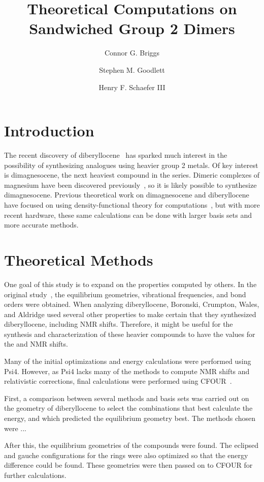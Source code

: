 \documentclass[journal=jpcafh, manuscript=article]{achemso}
\author{Connor G. Briggs}
\author{Stephen M. Goodlett}
\author{Henry F. Schaefer III}
\affiliation{Department of Chemistry and Center for Computational Quantum Chemistry, University of Georgia, Athens, GA, USA}
\title{Theoretical Computations on Sandwiched Group 2 Dimers}
\begin{document}
\begin{abstract}

\end{abstract}

\section{Introduction}

The recent discovery of diberyllocene~\cite{boronski_diberyllocene_2023} has sparked much interest in the possibility of synthesizing analogues using heavier group 2 metals. Of key interest is dimagnesocene, the next heaviest compound in the series. Dimeric complexes of magnesium have been discovered previously~\cite{stasch_stable_2011,green_stable_2007}, so it is likely possible to synthesize dimagnesocene. Previous theoretical work on dimagnesocene and diberyllocene have focused on using density-functional theory for computations~\cite{xie_characteristics_2005}, but with more recent hardware, these same calculations can be done with larger basis sets and more accurate methods.

\section{Theoretical Methods}

One goal of this study is to expand on the properties computed by others. In the original study~\cite{xie_characteristics_2005}, the equilibrium geometries, vibrational frequencies, and bond orders were obtained. When analyzing diberyllocene, Boronski, Crumpton, Wales, and Aldridge used several other properties to make certain that they synthesized diberyllocene, including NMR shifts. Therefore, it might be useful for the synthesis and characterization of these heavier compounds to have the values for the  and  NMR shifts.

Many of the initial optimizations and energy calculations were performed using Psi4. However, as Psi4 lacks many of the methods to compute NMR shifts and relativistic corrections, final calculations were performed using CFOUR~\cite{cfour}.

First, a comparison between several methods and basis sets was carried out on the geometry of diberyllocene to select the combinations that best calculate the energy, and which predicted the equilibrium geometry best. The methods chosen were ...

After this, the equilibrium geometries of the compounds were found. The eclipsed and gauche configurations for the rings were also optimized so that the energy difference could be found. These geometries were then passed on to CFOUR for further calculations.


\end{document}
